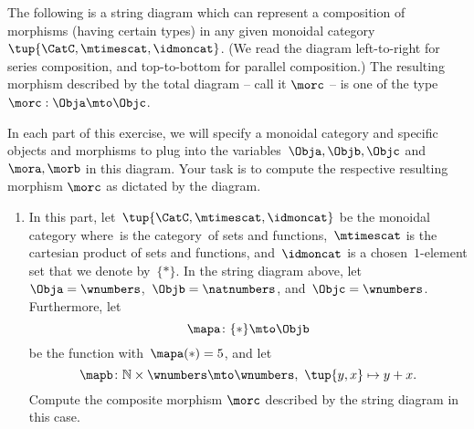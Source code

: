 \begin{gradedexercise}\label{ex:StringDiagrams}

    The following is a string diagram which can represent a composition of morphisms (having certain types) in any given monoidal category~$\tup{\CatC,\mtimescat,\idmoncat}$.
    (We read the diagram left-to-right for series composition, and top-to-bottom for parallel composition.) The resulting morphism described by the total diagram -- call it $\morc$ -- is one of the type~$\morc : \Obja \mto \Objc$.

    \begin{center}
        \label{eq:ExamStringDiagram1}
    \end{center}

    In each part of this exercise, we will specify a monoidal category and specific objects and morphisms to plug into the variables~$\Obja, \Objb, \Objc$ and~$\mora, \morb$ in this diagram.
    Your task is to compute the respective resulting morphism $\morc$ as dictated by the diagram.

    \begin{enumerate}
        \item In this part, let~$\tup{\CatC,\mtimescat,\idmoncat}$ be the monoidal category where~\CatC is the category~\Set of sets and functions,~$\mtimescat$ is the cartesian product of sets and functions, and~$\idmoncat$ is a chosen~$1$-element set that we denote by~$\{ * \}$.
        In the string diagram above, let~$\Obja = \wnumbers$,~$\Objb = \natnumbers$, and~$\Objc = \wnumbers$.
        Furthermore, let
        \begin{equation}
            \mapa\colon \{ * \} \mto \Objb
        \end{equation}
        be the function with~$\mapa(*) = 5$, and let
        \begin{equation}
            \mapb \colon \mathbb{N} \times \wnumbers \mto \wnumbers, \ \tup{y, x} \mapsto y + x.
        \end{equation}
        Compute the composite morphism $\morc$ described by the string diagram in this case.

        \


\end{enumerate}
\end{gradedexercise}
